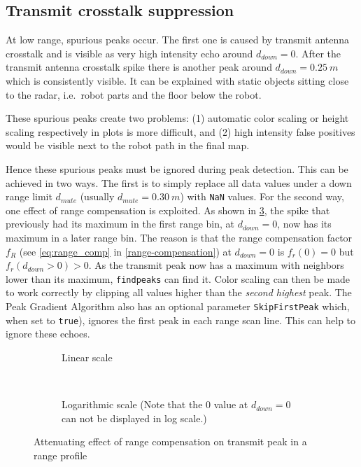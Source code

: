\subsection{Transmit crosstalk suppression}\label{transmit-crosstalk-suppression}

At low range, spurious peaks occur. The first one is caused by transmit
antenna crosstalk and is visible as very high intensity echo around
\(d_{down}=0\). After the transmit antenna crosstalk spike there is
another peak around \(d_{down}=\SI{0.25}{m}\) which is consistently visible. It
can be explained with static objects sitting close to the radar,
i.e.~robot parts and the floor below the robot.

These spurious peaks create two problems: (1) automatic color scaling or
height scaling respectively in plots is more difficult, and (2) high
intensity false positives would be visible next to the robot path in the
final map.

Hence these spurious peaks must be ignored during peak detection. This
can be achieved in two ways. The first is to simply replace all data
values under a down range limit \(d_{mute}\) (usually
\(d_{mute}=\SI{0.30}{m}\)) with \texttt{NaN} values. For the second way, one effect
of range compensation is exploited. As shown in \cref{fig:fig_range_compensation_transmit_spike}, the spike
that previously had its maximum in the first range bin, at
\(d_{down}=0\), now has its maximum in a later range bin. The reason is
that the range compensation factor $f_R$ (see \cref{eq:range_comp} in \cref{range-compensation}) at \(d_{down}=0\) is \(f_r(0) = 0\) but
\(f_r(d_{down}>0) > 0\). As the transmit peak now has a maximum with
neighbors lower than its maximum, \texttt{findpeaks} can find it. Color
scaling can then be made to work correctly by clipping all values higher
than the \emph{second highest} peak. The Peak Gradient Algorithm also
has an optional parameter \texttt{SkipFirstPeak} which, when set to
\texttt{true}), ignores the first peak in each range scan line. This can help
to ignore these echoes.

\begin{figure}[htbp]
    \centering
    \begin{subfigure}[t]{\textwidth}
        \centering
        \def\svgscale{.8}
        
        \caption{Linear scale}
        \label{fig:fig_range_compensation_transmit_spike_1}
    \end{subfigure}\bigskip\\
    \begin{subfigure}[t]{\textwidth}
        \centering
        \def\svgscale{.8}
        
        \caption{Logarithmic scale (Note that the \(0\) value at \(d_{down}=0\) can not be displayed in log scale.)}
        \label{fig:fig_range_compensation_transmit_spike_2}
    \end{subfigure}
    \caption{Attenuating effect of range compensation on transmit peak in a range profile}
    \label{fig:fig_range_compensation_transmit_spike}
\end{figure}

